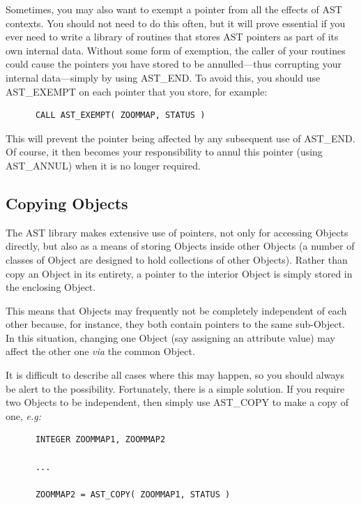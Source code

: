 \documentclass[twoside,11pt]{article}
\newcommand{\htmlref}[2]{#1}
\begin{document}
Sometimes, you may also want to exempt a pointer from all the effects
of AST contexts. You should not need to do this often, but it will
prove essential if you ever need to write a library of routines that
stores AST pointers as part of its own internal data. Without some
form of exemption, the caller of your routines could cause the
pointers you have stored to be annulled---thus corrupting your
internal data---simply by using AST\_END. To avoid this, you should
use \htmlref{AST\_EXEMPT}{AST_EXEMPT} on each pointer that you store, for example:

\small
\begin{verbatim}
      CALL AST_EXEMPT( ZOOMMAP, STATUS )
\end{verbatim}
\normalsize

This will prevent the pointer being affected by any subsequent use of
AST\_END. Of course, it then becomes your responsibility to annul this
pointer (using \htmlref{AST\_ANNUL}{AST_ANNUL}) when it is no longer required.

\subsection{\label{ss:copyingobjects}Copying Objects}

The AST library makes extensive use of pointers, not only for
accessing Objects directly, but also as a means of storing Objects
inside other Objects (a number of classes of \htmlref{Object}{Object} are designed to
hold collections of other Objects). Rather than copy an Object in its
entirety, a pointer to the interior Object is simply stored in the
enclosing Object.

This means that Objects may frequently not be completely independent
of each other because, for instance, they both contain pointers to the
same sub-Object. In this situation, changing one Object (say assigning
an attribute value) may affect the other one {\em{via}} the common
Object.

It is difficult to describe all cases where this may happen, so you
should always be alert to the possibility. Fortunately, there is a
simple solution. If you require two Objects to be independent, then
simply use \htmlref{AST\_COPY}{AST_COPY} to make a copy of one, {\em{e.g:}}

\small
\begin{verbatim}
      INTEGER ZOOMMAP1, ZOOMMAP2

      ...

      ZOOMMAP2 = AST_COPY( ZOOMMAP1, STATUS )
\end{verbatim}
\normalsize
\end{document}
